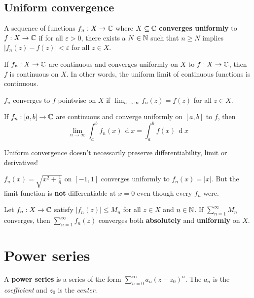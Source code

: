\documentclass[12pt]{article}
\renewcommand{\d}{\ensuremath{\operatorname{d}}}
\begin{document}
\subsection{Uniform convergence}
 A sequence of functions $f_n: X\to \mathbb{C}$ where $X\subseteq \mathbb{C}$ \textbf{converges uniformly} to $f:X\to \mathbb{C}$ if for all $\varepsilon>0$, there exists a $N\in \mathbb{N}$ such that $n\geq N$ implies $|f_n(z)-f(z)|<\varepsilon$ for all $z\in X$.

\begin{theorem}
    If $f_n: X\to \mathbb{C}$ are continuous and converges uniformly on $X$ to $f:X\to\mathbb{C}$, then $f$ is continuous on $X$.
    In other words, the uniform limit of continuous functions is continuous.
\end{theorem}

\rmk $f_n$ converges to $f$ pointwise on $X$ if $\lim_{n\to \infty}f_n(z)=f(z)$ for all $z\in X$.

\begin{theorem}
    If $f_n:[a,b]\to \mathbb{C}$ are continuous and converge uniformly on $[a,b]$ to $f$, then $$
    \lim_{n\to \infty}\int_{a}^{b}f_n(x)\,\d x = \int_{a}^{b}f(x)\,\d x
    $$
\end{theorem}

\rmk Uniform convergence doesn't necessarily preserve differentiability, limit or derivatives!

\eg $f_n(x)=\sqrt{x^2+\frac{1}{n}}$ on $[-1,1]$ converges uniformly to $f_n(x)=|x|$. But the limit function is \textbf{not} differentiable at $x=0$ even though every $f_n$ were.

\begin{theorem} 
    Let $f_n:X\to \mathbb{C}$ satisfy $|f_n(z)|\leq M_n$ for all $z\in X$ and $n\in \mathbb{N}$. If $\sum_{n=1}^{\infty}M_n$ converges, then $\sum_{n=1}^{\infty}f_n(z)$ converges both \textbf{absolutely} and \textbf{uniformly} on $X$.
\end{theorem}

\section{Power series}
 A \textbf{power series} is a series of the form $\sum_{n=0}^{\infty}a_n(z-z_0)^n$. The $a_n$ is the \textit{coefficient} and $z_0$ is the \textit{center}.
\end{document}
